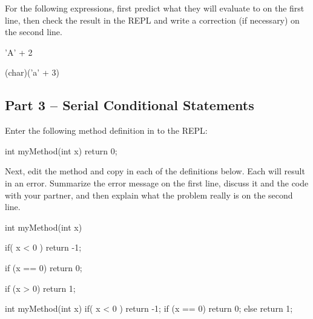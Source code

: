 \begin{eval}
For the following expressions, first predict what they will evaluate to on the first line, then check the result in the REPL and write a correction (if necessary) on the second line.

\begin{sevalenum}

\item 'A' + 2

\evallinetwo

\item (char)('a' + 3)

\evallinetwo
\end{sevalenum}
\end{eval}

\initialbox


\subsection{Part 3 -- Serial Conditional Statements}


\begin{eval}

Enter the following method definition in to the REPL:

\begin{code}

int myMethod(int x) { return 0; }

\end{code}

Next, edit the method and copy in each of the definitions below. Each will result in an error. Summarize the error message on the first line, discuss it and the code with your partner, and then explain what the problem really is on the second line. 

\begin{sevalenum}

\item
\begin{code}
int myMethod(int x) { 
  if( x < 0 ) {
    return -1;
  } 
  
  if (x == 0) {
    return 0;
  } 
  
  if (x > 0) {
    return 1;
  }
}
\end{code}

\evallinetwo

\item 
int myMethod(int x) { 
  if( x < 0 ) {
    return -1;
  } if (x == 0) {
    return 0;
  } else {
    return 1;
  }
}

\evallinetwo

\end{sevalenum}
\end{eval}



